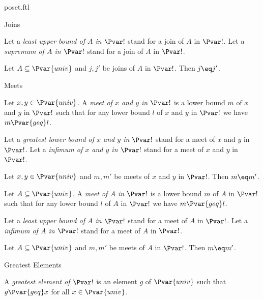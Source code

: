 \documentclass{naproche-library}
\begin{document}
\begin{smodule}[title=Posets]{poset.ftl}
\begin{sfragment}{Joins}
\begin{definition*}[forthel,id=JoinOfSetDef]
    Let a \emph{least upper bound of $A$ in $\Pvar!$} stand for a join of $A$ in $\Pvar!$.
    Let a \emph{supremum of $A$ in $\Pvar!$} stand for a join of $A$ in $\Pvar!$.
  \end{definition*}

  \begin{proposition*}[forthel,id=JoinOfSetIsUniqueThm]
    Let $A \subseteq \Pvar{univ}$ and $j, j'$ be joins of $A$ in $\Pvar!$.
    Then $j\eq j'$.
  \end{proposition*}
\end{sfragment}

\begin{sfragment}{Meets}
  \begin{definition*}[forthel,id=MeetOfPairDef]
    Let $x, y \in \Pvar{univ}$.
    A \emph{meet of $x$ and $y$ in $\Pvar!$} is a lower bound $m$ of $x$ and $y$ in $\Pvar!$ such that for any lower bound $l$ of $x$ and $y$ in $\Pvar!$ we have $m {\Pvar{geq}} l$.

    Let a \emph{greatest lower bound of $x$ and $y$ in $\Pvar!$} stand for a meet of $x$ and $y$ in $\Pvar!$.
    Let a \emph{infimum of $x$ and $y$ in $\Pvar!$} stand for a meet of $x$ and $y$ in $\Pvar!$.
  \end{definition*}

  \begin{proposition*}[forthel,id=MeetOfPairIsUniqueThm]
    Let $x, y \in \Pvar{univ}$ and $m, m'$ be meets of $x$ and $y$ in $\Pvar!$.
    Then $m\eq m'$.
  \end{proposition*}
      
  \begin{definition*}[forthel,id=MeetOfSetDef]
    Let $A \subseteq \Pvar{univ}$.
    A \emph{meet of $A$ in $\Pvar!$} is a lower bound $m$ of $A$ in $\Pvar!$ such that for any lower bound $l$ of $A$ in $\Pvar!$ we have $m {\Pvar{geq}} l$.

    Let a \emph{least upper bound of $A$ in $\Pvar!$} stand for a meet of $A$ in $\Pvar!$.
    Let a \emph{infimum of $A$ in $\Pvar!$} stand for a meet of $A$ in $\Pvar!$.
  \end{definition*}

  \begin{proposition*}[forthel,id=MeetOfSetIsUniqueThm]
    Let $A \subseteq \Pvar{univ}$ and $m, m'$ be meets of $A$ in $\Pvar!$.
    Then $m\eq m'$.
  \end{proposition*}
\end{sfragment}

\begin{sfragment}{Greatest Elements}
  \begin{definition*}[forthel,id=GreatestElementDef]
    A \emph{greatest element of $\Pvar!$} is an element $g$ of $\Pvar{univ}$ such that $g {\Pvar{geq}} x$ for all $x \in \Pvar{univ}$.
  \end{definition*}


\end{sfragment}
\end{smodule}
\end{document}
